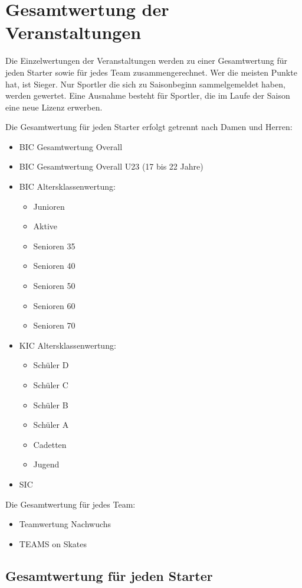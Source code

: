 \section{Gesamtwertung der Veranstaltungen}
Die Einzelwertungen der Veranstaltungen werden zu einer Gesamtwertung für jeden Starter sowie für jedes Team zusammengerechnet. Wer die meisten Punkte hat, ist Sieger. Nur Sportler die sich zu Saisonbeginn sammelgemeldet haben, werden gewertet. Eine Ausnahme besteht für Sportler, die im Laufe der Saison eine neue Lizenz erwerben.

Die Gesamtwertung für jeden Starter erfolgt getrennt nach Damen und Herren:
\begin{itemize}
	\item BIC Gesamtwertung Overall
	\item BIC Gesamtwertung Overall U23 (17 bis 22 Jahre)
	\item BIC Altersklassenwertung:
	\begin{itemize}
		\item Junioren
		\item Aktive
		\item Senioren 35
		\item Senioren 40
		\item Senioren 50
		\item Senioren 60
		\item Senioren 70
	\end{itemize}
	\item KIC Altersklassenwertung:
	\begin{itemize}
		\item Schüler D
		\item Schüler C
		\item Schüler B
		\item Schüler A
		\item Cadetten
		\item Jugend
	\end{itemize}
	\item SIC
\end{itemize}

Die Gesamtwertung für jedes Team:
\begin{itemize}
	\item Teamwertung Nachwuchs
	\item TEAMS on Skates
\end{itemize}

\subsection{Gesamtwertung für jeden Starter}

